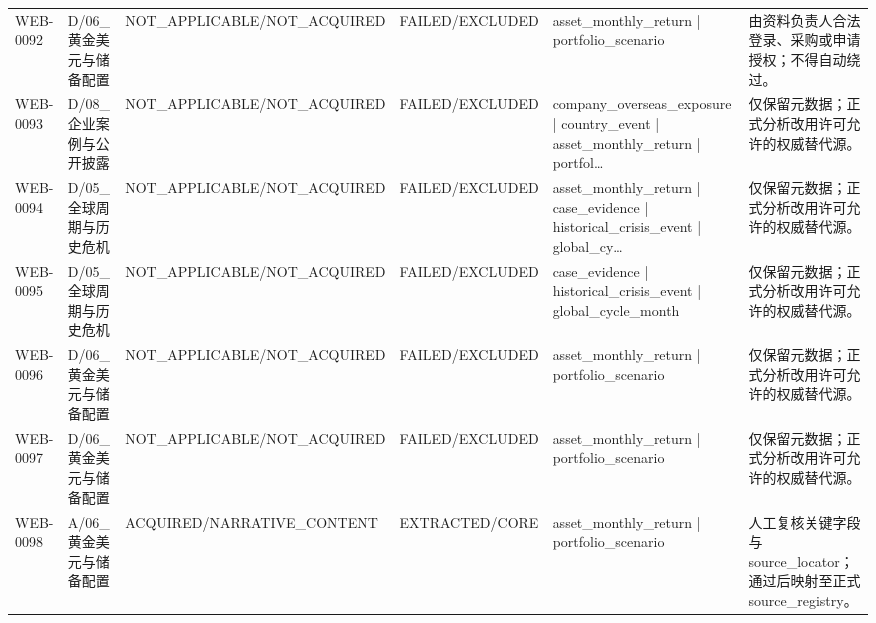 \begin{landscape}
\begin{longtable}{p{1.8cm}p{2.6cm}p{2.6cm}p{2.6cm}p{4.8cm}p{7.2cm}}
WEB-0092 & D/\allowbreak{}06\_\allowbreak{}黄金美元与储备配置 & NOT\_\allowbreak{}APPLICABLE/\allowbreak{}NOT\_\allowbreak{}ACQUIRED & FAILED/\allowbreak{}EXCLUDED & asset\_\allowbreak{}monthly\_\allowbreak{}return | portfolio\_\allowbreak{}scenario & 由资料负责人合法登录、采购或申请授权；不得自动绕过。\\
WEB-0093 & D/\allowbreak{}08\_\allowbreak{}企业案例与公开披露 & NOT\_\allowbreak{}APPLICABLE/\allowbreak{}NOT\_\allowbreak{}ACQUIRED & FAILED/\allowbreak{}EXCLUDED & company\_\allowbreak{}overseas\_\allowbreak{}exposure | country\_\allowbreak{}event | asset\_\allowbreak{}monthly\_\allowbreak{}return | portfol… & 仅保留元数据；正式分析改用许可允许的权威替代源。\\
WEB-0094 & D/\allowbreak{}05\_\allowbreak{}全球周期与历史危机 & NOT\_\allowbreak{}APPLICABLE/\allowbreak{}NOT\_\allowbreak{}ACQUIRED & FAILED/\allowbreak{}EXCLUDED & asset\_\allowbreak{}monthly\_\allowbreak{}return | case\_\allowbreak{}evidence | historical\_\allowbreak{}crisis\_\allowbreak{}event | global\_\allowbreak{}cy… & 仅保留元数据；正式分析改用许可允许的权威替代源。\\
WEB-0095 & D/\allowbreak{}05\_\allowbreak{}全球周期与历史危机 & NOT\_\allowbreak{}APPLICABLE/\allowbreak{}NOT\_\allowbreak{}ACQUIRED & FAILED/\allowbreak{}EXCLUDED & case\_\allowbreak{}evidence | historical\_\allowbreak{}crisis\_\allowbreak{}event | global\_\allowbreak{}cycle\_\allowbreak{}month & 仅保留元数据；正式分析改用许可允许的权威替代源。\\
WEB-0096 & D/\allowbreak{}06\_\allowbreak{}黄金美元与储备配置 & NOT\_\allowbreak{}APPLICABLE/\allowbreak{}NOT\_\allowbreak{}ACQUIRED & FAILED/\allowbreak{}EXCLUDED & asset\_\allowbreak{}monthly\_\allowbreak{}return | portfolio\_\allowbreak{}scenario & 仅保留元数据；正式分析改用许可允许的权威替代源。\\
WEB-0097 & D/\allowbreak{}06\_\allowbreak{}黄金美元与储备配置 & NOT\_\allowbreak{}APPLICABLE/\allowbreak{}NOT\_\allowbreak{}ACQUIRED & FAILED/\allowbreak{}EXCLUDED & asset\_\allowbreak{}monthly\_\allowbreak{}return | portfolio\_\allowbreak{}scenario & 仅保留元数据；正式分析改用许可允许的权威替代源。\\
WEB-0098 & A/\allowbreak{}06\_\allowbreak{}黄金美元与储备配置 & ACQUIRED/\allowbreak{}NARRATIVE\_\allowbreak{}CONTENT & EXTRACTED/\allowbreak{}CORE & asset\_\allowbreak{}monthly\_\allowbreak{}return | portfolio\_\allowbreak{}scenario & 人工复核关键字段与source\_\allowbreak{}locator；通过后映射至正式source\_\allowbreak{}registry。\\

\end{longtable}
\end{landscape}
